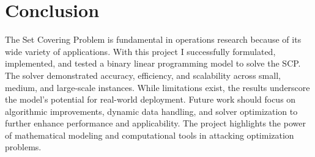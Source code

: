 \documentclass[11pt,letterpaper]{article}
\begin{document}
\section*{Conclusion}
The Set Covering Problem is fundamental in operations research because of its wide variety of applications. With this project I successfully formulated, implemented, and tested a binary linear programming model to solve the SCP. The solver demonstrated accuracy, efficiency, and scalability across small, medium, and large-scale instances. While limitations exist, the results underscore the model's potential for real-world deployment. Future work should focus on algorithmic improvements, dynamic data handling, and solver optimization to further enhance performance and applicability. The project highlights the power of mathematical modeling and computational tools in attacking optimization problems.

\bigskip



\end{document}
